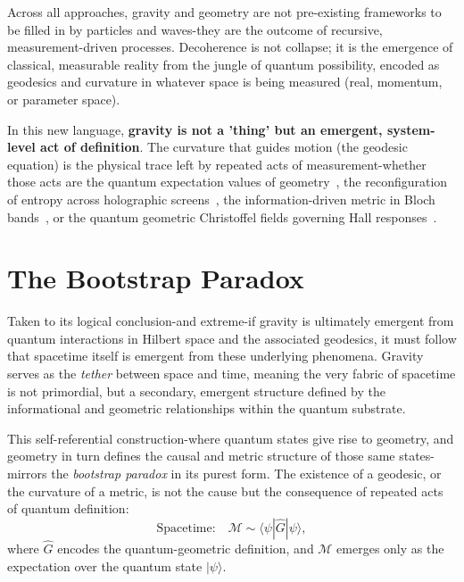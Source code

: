 \vspace{1em}
Across all approaches, gravity and geometry are not pre-existing frameworks to be filled in by particles and waves-they are the outcome of recursive, measurement-driven processes. Decoherence is not collapse; it is the emergence of classical, measurable reality from the jungle of quantum possibility, encoded as geodesics and curvature in whatever space is being measured (real, momentum, or parameter space).

In this new language, \textbf{gravity is not a 'thing' but an emergent, system-level act of definition}. The curvature that guides motion (the geodesic equation) is the physical trace left by repeated acts of measurement-whether those acts are the quantum expectation values of geometry~\cite{liu_kaluza-klein_2025}, the reconfiguration of entropy across holographic screens~\cite{verlinde_origin_2011}, the information-driven metric in Bloch bands~\cite{smith_momentum-space_2022}, or the quantum geometric Christoffel fields governing Hall responses~\cite{yoshida_emergent-gravity_2025}.

\section{The Bootstrap Paradox}

Taken to its logical conclusion-and extreme-if gravity is ultimately emergent from quantum interactions in Hilbert space and the associated geodesics, it must follow that spacetime itself is emergent from these underlying phenomena. Gravity serves as the \emph{tether} between space and time, meaning the very fabric of spacetime is not primordial, but a secondary, emergent structure defined by the informational and geometric relationships within the quantum substrate.

This self-referential construction-where quantum states give rise to geometry, and geometry in turn defines the causal and metric structure of those same states-mirrors the \emph{bootstrap paradox} in its purest form. The existence of a geodesic, or the curvature of a metric, is not the cause but the consequence of repeated acts of quantum definition:
\begin{equation}
\text{Spacetime:} \quad \mathcal{M} \sim \langle \psi | \hat{G} | \psi \rangle,
\end{equation}
where $\hat{G}$ encodes the quantum-geometric definition, and $\mathcal{M}$ emerges only as the expectation over the quantum state $|\psi\rangle$.

